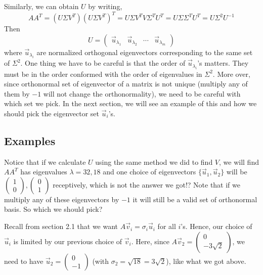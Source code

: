 \documentclass{article}
\begin{document}
Similarly, we can obtain $U$ by writing,
$$AA^T = (U \Sigma V^T)(U \Sigma V^T)^T = U \Sigma V^T V \Sigma^TU^T = U \Sigma  \Sigma^TU^T = U  \Sigma^2U^{-1}$$
Then 
$$U = \begin{pmatrix} \vec{u}_{\lambda_1} & \vec{u}_{\lambda_2} & \cdots & \vec{u}_{\lambda_m} \end{pmatrix}$$ 
where $\vec{u}_{\lambda_i}$ are normalized orthogonal eigenvectors corresponding to the same set of $\Sigma^2$. One thing we have to be careful is that the order of $\vec{u}_{\lambda_i}$'s matters. They must be in the order conformed with the order of eigenvalues in $\Sigma^2$. More over, since orthonormal set of eigenvector of a matrix is not unique (multiply any of them by $-1$ will not change the orthonormality), we need to be careful with which set we pick. In the next section, we will see an example of this and how we should pick the eigenvector set $\vec{u}_i$'s.

\subsection{Examples}

Notice that if we calculate $U$ using the same method we did to find $V$, we will find $AA^T$ has eigenvalues $\lambda = 32, 18$ and one choice of eigenvectors $\{ \vec{u}_1, \vec{u}_2 \}$  will be $\begin{pmatrix}  1 \\ 0 \end{pmatrix}, \begin{pmatrix}  0 \\ 1 \end{pmatrix}$ receptively, which is not the answer we got!? Note that if we multiply any of these eigenvectors by $-1$ it will still be a valid set of orthonormal basis. So which we should pick?

Recall from section 2.1 that we want $ A \vec{v}_i = \sigma_i \vec{u}_i$ for all $i$'s. Hence, our choice of $\vec{u}_i$ is limited by our previous choice of $\vec{v}_i$. Here, since $A\vec{v}_2= \begin{pmatrix} 0 \\  -3 \sqrt{2} \end{pmatrix}$, we need to have $\vec{u}_2 = \begin{pmatrix}   0 \\ -1 \end{pmatrix}$ (with $\sigma_2 = \sqrt{18} = 3 \sqrt{2}$), like what we got above.

\newpage
\end{document}
